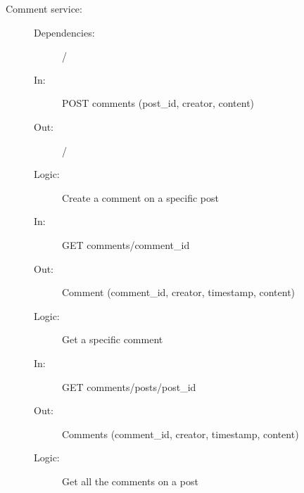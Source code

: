 \documentclass{article}
\begin{document}
\begin{description}
    \item [Comment service:]
    \begin{description}
        \item[]
        \item[Dependencies:] /
    \end{description}
    \begin{description}
        \item[]
        \item[In:] POST comments (post\_id, creator, content)
        \item[Out:] /
        \item[Logic:] Create a comment on a specific post
        \item[]
        
        \item[In:] GET comments/comment\_id
        \item[Out:] Comment (comment\_id, creator, timestamp, content)
        \item[Logic:] Get a specific comment
        \item[]

        \item[In:] GET comments/posts/post\_id
        \item[Out:] Comments (comment\_id, creator, timestamp, content)
        \item[Logic:] Get all the comments on a post
        \item[]
    \end{description}
\end{description}
\end{document}
